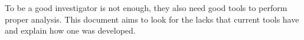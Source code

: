 To be a good investigator is not enough, they also need good tools to perform
proper analysis. This document aims to look for the lacks that current tools 
have and explain how one was developed.


%
%


